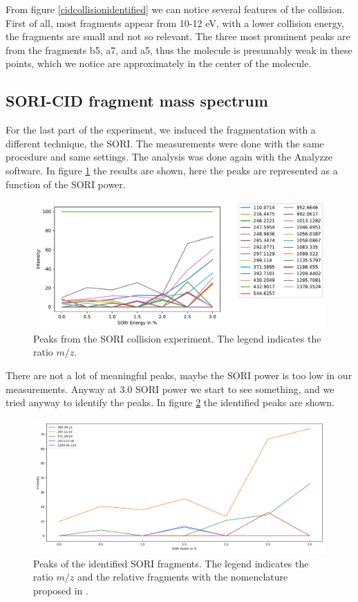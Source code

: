 \documentclass[a4paper,10pt]{article}
\begin{document}
From figure \ref{cidcollisionidentified} we can notice several features of the collision. First of all, most fragments appear from 10-12 eV, with a lower collision energy, the fragments are small and not so relevant. The three most prominent peaks are from the fragments b5, a7, and a5, thus the molecule is presumably weak in these points, which we notice are approximately in the center of the molecule.  

\subsection{SORI-CID fragment mass spectrum}
For the last part of the experiment, we induced the fragmentation with a different technique, the SORI. The measurements were done with the same procedure and same settings. The analysis was done again with the Analyzze software. In figure \ref{soricollision} the results are shown, here the peaks are represented as a function of the SORI power.

\begin{figure}[H]
	\centering
	\includegraphics[width = \textwidth]{sori_cid.pdf}
	\caption{Peaks from the SORI collision experiment. The legend indicates the ratio $m/z$.}
	\label{soricollision}
\end{figure}
There are not a lot of meaningful peaks, maybe the SORI power is too low in our measurements. Anyway at 3.0 SORI power we start to see something, and we tried anyway to identify the peaks. In figure \ref{soriidentified} the identified peaks are shown. 

\begin{figure}[H]
	\centering
	\includegraphics[width = \textwidth]{identifiedsori.png}
	\caption{Peaks of the identified SORI fragments. The legend indicates the ratio $m/z$ and the relative fragments with the nomenclature proposed in \cite{fragmentsnomenclature}.}
	\label{soriidentified}
\end{figure}
\end{document}
